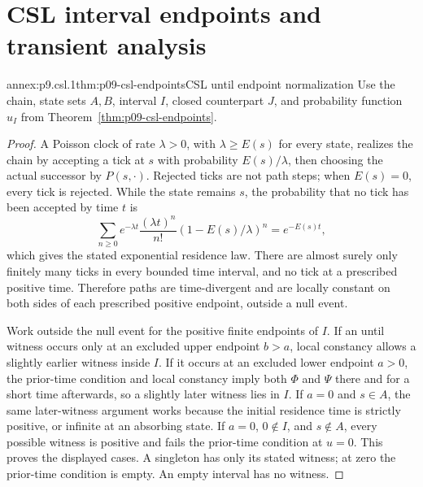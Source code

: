 
\section{CSL interval endpoints and transient analysis}
\label{sec:annex-p09-csl-corrections}

\begin{annexitem}{annex:p9.csl.1}{thm:p09-csl-endpoints}{CSL until endpoint normalization}
Use the chain, state sets \(A,B\), interval \(I\), closed counterpart \(J\),
and probability function \(u_I\) from Theorem~\ref{thm:p09-csl-endpoints}.
\begin{proof}
A Poisson clock of rate \(\lambda>0\), with
\(\lambda\geq E(s)\) for every state, realizes the chain by accepting a tick
at \(s\) with probability \(E(s)/\lambda\), then choosing the actual
successor by \(P(s,\cdot)\).  Rejected ticks are not path steps; when
\(E(s)=0\), every tick is rejected.  While the state remains \(s\), the
probability that no tick has been accepted by time \(t\) is
\[
 \sum_{n\geq0}e^{-\lambda t}\frac{(\lambda t)^n}{n!}
       (1-E(s)/\lambda)^n=e^{-E(s)t},
\]
which gives the stated exponential residence law.  There are almost surely
only finitely many ticks in every bounded time interval, and no tick at a
prescribed positive time.  Therefore
paths are time-divergent and are locally constant on both sides of each
prescribed positive endpoint, outside a null event.

Work outside the null event for the positive finite endpoints of \(I\).
If an until witness occurs only at an excluded upper endpoint \(b>a\),
local constancy allows a slightly earlier witness inside \(I\).
If it occurs at an excluded lower endpoint \(a>0\), the prior-time condition
and local constancy imply both \(\Phi\) and \(\Psi\) there and for a short
time afterwards, so a slightly later witness lies in \(I\).
If \(a=0\) and \(s\in A\), the same later-witness argument works because
the initial residence time is strictly positive, or infinite at an absorbing
state.  If \(a=0\), \(0\notin I\), and \(s\notin A\), every possible
witness is positive and fails the prior-time condition at \(u=0\).
This proves the displayed cases.  A singleton has only its stated witness;
at zero the prior-time condition is empty.  An empty interval has no witness.
\end{proof}
\end{annexitem}


